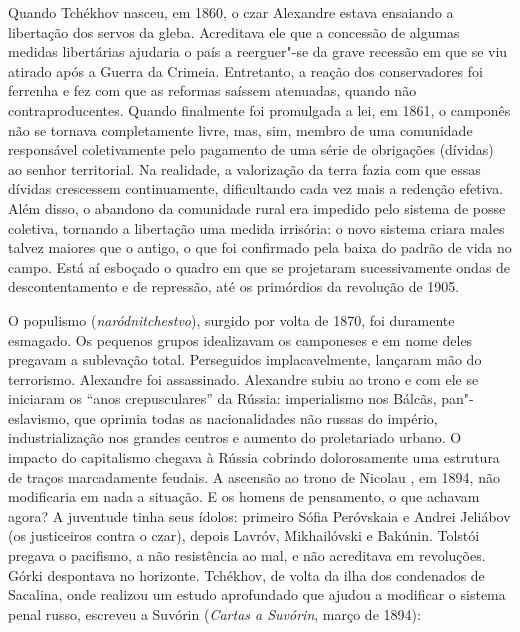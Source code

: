 Quando Tchékhov nasceu, em 1860, o czar Alexandre 
estava ensaiando a libertação dos servos da gleba. Acreditava ele
que a concessão de algumas medidas libertárias ajudaria o país a
reerguer"-se da grave recessão em que se viu atirado após a
Guerra da Crimeia. Entretanto, a reação dos conservadores foi
ferrenha e fez com que as reformas saíssem atenuadas, quando
não contraproducentes. Quando finalmente foi promulgada a lei, em
1861, o camponês não se tornava completamente livre, mas, sim,
membro de uma comunidade responsável coletivamente pelo pagamento
de uma série de obrigações (dívidas) ao senhor territorial. Na
realidade, a valorização da terra fazia com que essas dívidas
crescessem continuamente, dificultando cada vez mais a redenção
efetiva. Além disso, o abandono da comunidade rural era impedido
pelo sistema de posse coletiva, tornando a libertação uma
medida irrisória: o novo sistema criara males talvez maiores que
o antigo, o que foi confirmado pela baixa do padrão de vida no
campo. Está aí esboçado o quadro em que se projetaram sucessivamente
ondas de descontentamento e de repressão, até os primórdios da revolução
de 1905.

O populismo (\emph{naródnitchestvo}), surgido por volta de 1870,
foi duramente esmagado. Os pequenos grupos idealizavam os camponeses
e em nome deles pregavam a sublevação total. Perseguidos
implacavelmente, lançaram mão do terrorismo. Alexandre 
foi assassinado. Alexandre  subiu ao trono e com ele
se iniciaram os ``anos crepusculares'' da Rússia: imperialismo nos
Bálcãs, pan"-eslavismo, que oprimia todas as nacionalidades não
russas do império, industrialização nos grandes centros e aumento
do proletariado urbano. O impacto do capitalismo chegava à Rússia
cobrindo dolorosamente uma estrutura de traços marcadamente feudais.
A ascensão ao trono de Nicolau , em 1894, não modificaria
em nada a situação. E os homens de pensamento, o que achavam agora?
A juventude tinha seus ídolos: primeiro Sófia Peróvskaia e Andrei
Jeliábov (os justiceiros contra o czar), depois Lavróv, Mikhailóvski
e Bakúnin. Tolstói pregava o pacifismo, a não resistência ao mal, e
não acreditava em revoluções. Górki despontava no horizonte. Tchékhov,
de volta da ilha dos condenados de Sacalina, onde realizou um
estudo aprofundado que ajudou a modificar o sistema penal russo,
escreveu a Suvórin (\emph{Cartas a Suvórin}, março de 1894): 

